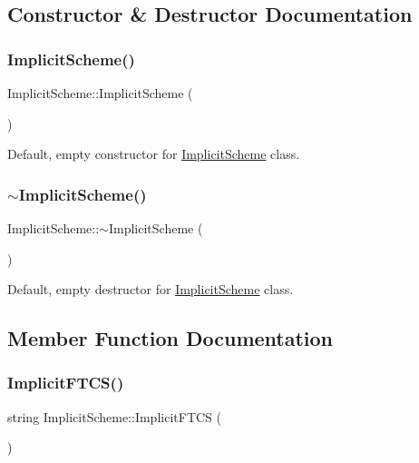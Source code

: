 \subsection{Constructor \& Destructor Documentation}
\mbox{\label{class_implicit_scheme_a7bb3a64ab8d7ca0b58ed4ba9817b8c12}} 
\subsubsection{\texorpdfstring{Implicit\+Scheme()}{ImplicitScheme()}}
{\footnotesize\ttfamily Implicit\+Scheme\+::\+Implicit\+Scheme (\begin{DoxyParamCaption}{ }\end{DoxyParamCaption})}

Default, empty constructor for \mbox{\hyperlink{class_implicit_scheme}{Implicit\+Scheme}} class. \mbox{\label{class_implicit_scheme_aca61347d2335e248678f7f3060785762}} 
\subsubsection{\texorpdfstring{$\sim$\+Implicit\+Scheme()}{~ImplicitScheme()}}
{\footnotesize\ttfamily Implicit\+Scheme\+::$\sim$\+Implicit\+Scheme (\begin{DoxyParamCaption}{ }\end{DoxyParamCaption})}

Default, empty destructor for \mbox{\hyperlink{class_implicit_scheme}{Implicit\+Scheme}} class. 

\subsection{Member Function Documentation}
\mbox{\label{class_implicit_scheme_afd2b8e73e914a04c326b8cba0d5810ce}} 
\subsubsection{\texorpdfstring{Implicit\+F\+T\+C\+S()}{ImplicitFTCS()}}
{\footnotesize\ttfamily string Implicit\+Scheme\+::\+Implicit\+F\+T\+CS (\begin{DoxyParamCaption}{ }\end{DoxyParamCaption})}

